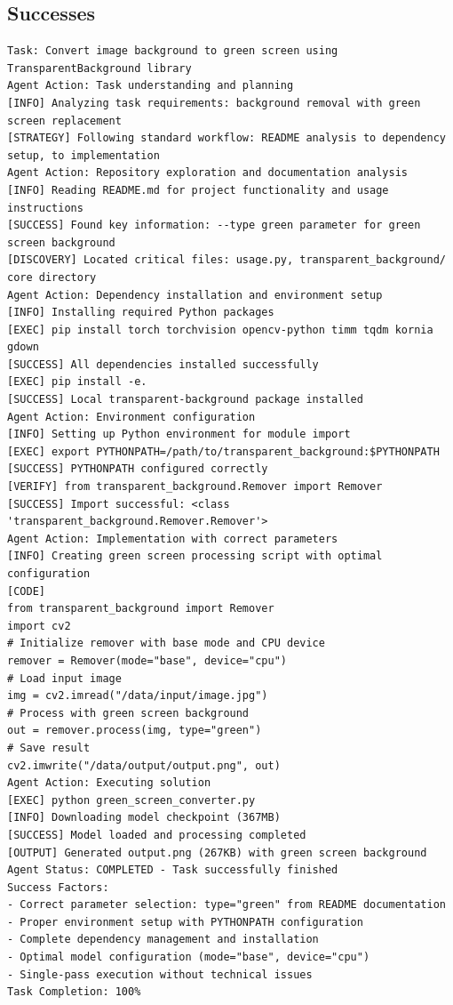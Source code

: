 \subsection*{Successes}
\begin{lstlisting}[language={},caption={TransparentBackground green screen processing successfully completed with correct parameter selection.},label={lst:transparent-success}]
Task: Convert image background to green screen using TransparentBackground library
Agent Action: Task understanding and planning
[INFO] Analyzing task requirements: background removal with green screen replacement
[STRATEGY] Following standard workflow: README analysis to dependency setup, to implementation
Agent Action: Repository exploration and documentation analysis
[INFO] Reading README.md for project functionality and usage instructions
[SUCCESS] Found key information: --type green parameter for green screen background
[DISCOVERY] Located critical files: usage.py, transparent_background/ core directory
Agent Action: Dependency installation and environment setup
[INFO] Installing required Python packages
[EXEC] pip install torch torchvision opencv-python timm tqdm kornia gdown
[SUCCESS] All dependencies installed successfully
[EXEC] pip install -e. 
[SUCCESS] Local transparent-background package installed
Agent Action: Environment configuration
[INFO] Setting up Python environment for module import
[EXEC] export PYTHONPATH=/path/to/transparent_background:$PYTHONPATH
[SUCCESS] PYTHONPATH configured correctly
[VERIFY] from transparent_background.Remover import Remover
[SUCCESS] Import successful: <class 'transparent_background.Remover.Remover'>
Agent Action: Implementation with correct parameters
[INFO] Creating green screen processing script with optimal configuration
[CODE]
from transparent_background import Remover
import cv2
# Initialize remover with base mode and CPU device
remover = Remover(mode="base", device="cpu")
# Load input image
img = cv2.imread("/data/input/image.jpg")
# Process with green screen background
out = remover.process(img, type="green")
# Save result
cv2.imwrite("/data/output/output.png", out)
Agent Action: Executing solution
[EXEC] python green_screen_converter.py
[INFO] Downloading model checkpoint (367MB)
[SUCCESS] Model loaded and processing completed
[OUTPUT] Generated output.png (267KB) with green screen background
Agent Status: COMPLETED - Task successfully finished
Success Factors:
- Correct parameter selection: type="green" from README documentation
- Proper environment setup with PYTHONPATH configuration  
- Complete dependency management and installation
- Optimal model configuration (mode="base", device="cpu")
- Single-pass execution without technical issues
Task Completion: 100% 
\end{lstlisting}


